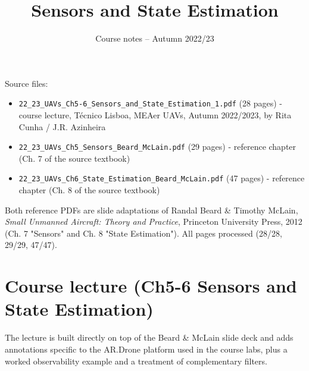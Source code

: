 \documentclass[11pt]{article}
\title{Sensors and State Estimation}
\author{Course notes -- Autumn 2022/23}
\date{}
\begin{document}
\maketitle
\tableofcontents
\vspace{1em}

Source files:
\begin{itemize}
\item \texttt{22\_\allowbreak{}23\_\allowbreak{}UAVs\_\allowbreak{}Ch5-6\_\allowbreak{}Sensors\_\allowbreak{}and\_\allowbreak{}State\_\allowbreak{}Estimation\_\allowbreak{}1.pdf} (28 pages) - course lecture, Técnico Lisboa, MEAer UAVs, Autumn 2022/2023, by Rita Cunha / J.R. Azinheira
\item \texttt{22\_\allowbreak{}23\_\allowbreak{}UAVs\_\allowbreak{}Ch5\_\allowbreak{}Sensors\_\allowbreak{}Beard\_\allowbreak{}McLain.pdf} (29 pages) - reference chapter (Ch. 7 of the source textbook)
\item \texttt{22\_\allowbreak{}23\_\allowbreak{}UAVs\_\allowbreak{}Ch6\_\allowbreak{}State\_\allowbreak{}Estimation\_\allowbreak{}Beard\_\allowbreak{}McLain.pdf} (47 pages) - reference chapter (Ch. 8 of the source textbook)
\end{itemize}

Both reference PDFs are slide adaptations of Randal Beard \& Timothy McLain, \textit{Small Unmanned Aircraft: Theory and Practice}, Princeton University Press, 2012 (Ch. 7 "Sensors" and Ch. 8 "State Estimation"). All pages processed (28/28, 29/29, 47/47).

\section{Course lecture (Ch5-6 Sensors and State Estimation)}

The lecture is built directly on top of the Beard \& McLain slide deck and adds annotations specific to the AR.Drone platform used in the course labs, plus a worked observability example and a treatment of complementary filters.
\end{document}
